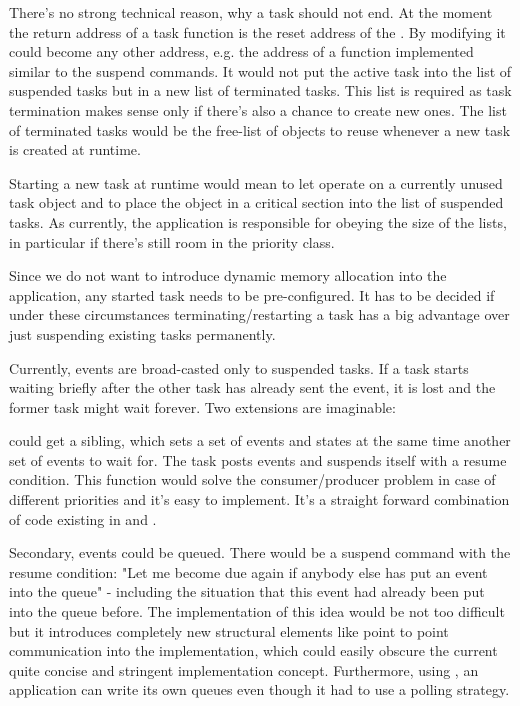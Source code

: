 There's no strong technical reason, why a task should not end. At the
moment the return address of a task function is the reset address of the
\uC{}. By modifying  it could become any other
address, e.g. the address of a function implemented similar to the suspend
commands. It would not put the active task into the list of suspended
tasks but in a new list of terminated tasks. This list is required as task
termination makes sense only if there's also a chance to create new ones.
The list of terminated tasks would be the free-list of objects to reuse
whenever a new task is created at runtime.

Starting a new task at runtime would mean to let 
operate on a currently unused task object and to place the object in a
critical section into the list of suspended tasks. As currently, the
application is responsible for obeying the size of the lists, in
particular if there's still room in the priority class.

Since we do not want to introduce dynamic memory allocation into the
application, any started task needs to be pre-configured. It has to be
decided if under these circumstances terminating/restarting a task has a
big advantage over just suspending existing tasks permanently.

Currently, events are broad-casted only to suspended tasks. If a task
starts waiting briefly after the other task has already sent the event, it
is lost and the former task might wait forever. Two extensions are
imaginable:

 could get a sibling, which sets a set of events and
states at the same time another set of events to wait for. The task posts
events and suspends itself with a resume condition. This function would
solve the consumer/producer problem in case of different priorities and
it's easy to implement. It's a straight forward combination of code
existing in  and .

Secondary, events could be queued. There would be a suspend command with
the resume condition: "Let me become due again if anybody else has put an
event into the queue" - including the situation that this event had
already been put into the queue before. The implementation of this idea
would be not too difficult but it introduces completely new structural
elements like point to point communication into the implementation, which
could easily obscure the current quite concise and stringent
implementation concept. Furthermore, using
, an \rtos{} application can write
its own queues even though it had to use a polling strategy.